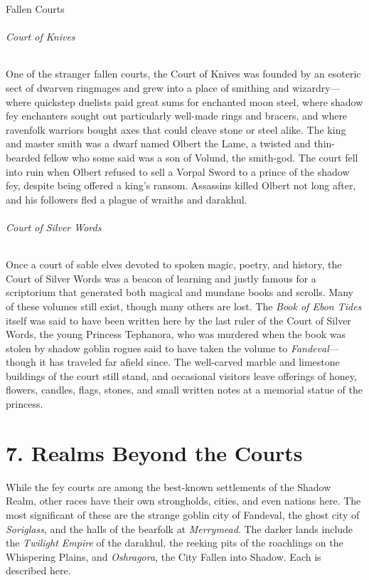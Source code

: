 \documentclass[10pt,a4paper,twoside,bg=print,twocolumn,openany,nodeprecatedcode]{dndbook}
\begin{document}
\begin{DndSidebar}[float=!b]{Fallen Courts}
\subparagraph{Court of Knives}
One of the stranger fallen courts, the Court of Knives was founded by an esoteric sect of dwarven ringmages and grew into a place of smithing and wizardry—where quickstep duelists paid great sums for enchanted moon steel, where shadow fey enchanters sought out particularly well-made rings and bracers, and where ravenfolk warriors bought axes that could cleave stone or steel alike. The king and master smith was a dwarf named Olbert the Lame, a twisted and thin-bearded fellow who some said was a son of Volund, the smith-god. The court fell into ruin when Olbert refused to sell a Vorpal Sword to a prince of the shadow fey, despite being offered a king's ransom. Assassins killed Olbert not long after, and his followers fled a plague of wraiths and darakhul.



\subparagraph{Court of Silver Words}
Once a court of sable elves devoted to spoken magic, poetry, and history, the Court of Silver Words was a beacon of learning and justly famous for a scriptorium that generated both magical and mundane books and scrolls. Many of these volumes still exist, though many others are lost. The \textit{Book of Ebon Tides} itself was said to have been written here by the last ruler of the Court of Silver Words, the young Princess Tephanora, who was murdered when the book was stolen by shadow goblin rogues said to have taken the volume to \textit{Fandeval}—though it has traveled far afield since. The well-carved marble and limestone buildings of the court still stand, and occasional visitors leave offerings of honey, flowers, candles, flags, stones, and small written notes at a memorial statue of the princess.



\end{DndSidebar}

\chapter{7. Realms Beyond the Courts}
While the fey courts are among the best-known settlements of the Shadow Realm, other races have their own strongholds, cities, and even nations here. The most significant of these are the strange goblin city of Fandeval, the ghost city of \textit{Soriglass}, and the halls of the bearfolk at \textit{Merrymead}. The darker lands include the \textit{Twilight Empire} of the darakhul, the reeking pits of the roachlings on the Whispering Plains, and \textit{Oshragora}, the City Fallen into Shadow. Each is described here.
\end{document}
